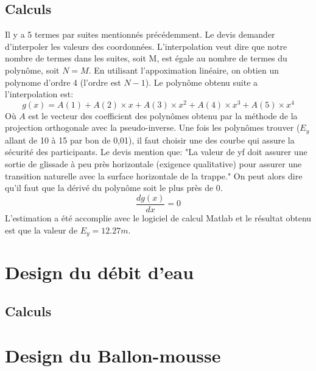 \documentclass[12pt]{article}
\begin{document}
\subsection{Calculs}
Il y a 5 termes par suites mentionnés précédemment. Le devis demander d'interpoler les valeurs des coordonnées. L'interpolation veut dire que notre nombre de termes dans les suites, soit M, est égale au nombre de termes du polynôme, soit $N=M$. En utilisant l'appoximation linéaire, on obtien un polynome d'ordre 4 (l'ordre est $N-1$). Le polynôme obtenu suite a l'interpolation est: 
\begin{equation}
g(x) = A(1) + A(2)\times x + A(3)\times x^2 + A(4)\times x^3 + A(5)\times x^4 
\end{equation}
Où $A$ est le vecteur des coefficient des polynômes obtenu par la méthode de la projection orthogonale avec la pseudo-inverse. 
\newpage
\noindent
Une fois les polynômes trouver ($E_y$ allant de 10 à 15 par bon de 0,01), il faut choisir une des courbe qui assure la sécurité des participants. Le devis mention que: "La valeur de yf doit assurer une sortie de glissade à peu près horizontale (exigence qualitative) pour assurer une transition naturelle avec la surface horizontale de la trappe." On peut alors dire qu'il faut que la dérivé du polynôme soit le plus près de 0. 
\begin{equation}
\frac{dg(x)}{dx} = 0
\end{equation}
L'estimation a été accomplie avec le logiciel de calcul Matlab et le résultat obtenu est que la valeur de $E_y = 12.27m$. 

\section{Design du débit d'eau}
\subsection{Calculs}

\section{Design du Ballon-mousse}
\end{document}
